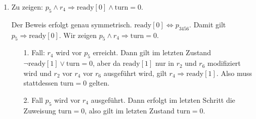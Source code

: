\documentclass[numbers=noendperiod]{scrartcl}
\begin{document}
\begin{enumerate}[a)]
\begin{enumerate}[(1.)]
		\item Zu zeigen: $p_5 \land r_4 \Rightarrow \text{ready}[0] \land \text{turn} = 0$.
		
		Der Beweis erfolgt genau symmetrisch. $\text{ready}[0] \Leftrightarrow p_{3456}$. Damit gilt $p_5 \Rightarrow \text{ready}[0]$. Wir zeigen $p_5 \land r_4 \Rightarrow \text{turn} = 0$.
		\begin{enumerate}
			\item[1. Fall:] $r_4$ wird vor $p_5$ erreicht. Dann gilt im letzten Zustand $\lnot \text{ready}[1] \lor \text{turn} = 0$, aber da $\text{ready}[1]$ nur in $r_2$ und $r_6$ modifiziert wird und $r_2$ vor $r_4$ vor $r_6$ ausgeführt wird, gilt $r_4 \Rightarrow \text{ready}[1]$. Also muss stattdessen $\text{turn} = 0 $ gelten.
			\item[2. Fall] $p_5$ wird vor $r_4$ ausgeführt. Dann erfolgt im letzten Schritt die Zuweisung $\text{turn} = 0$, also gilt im letzten Zustand $\text{turn} = 0$.
		\end{enumerate}
	\end{enumerate}
\end{enumerate}
\end{document}
